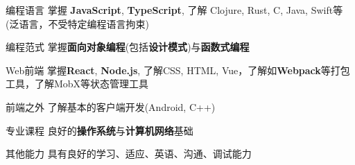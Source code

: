 

\begin{cvskills}

    \cvskill
    {编程语言} %
    {掌握 \textbf{JavaScript}, \textbf{TypeScript}, 了解 Clojure, Rust, C, Java, Swift等(泛语言，不受特定编程语言拘束)} %

    \cvskill
    {编程范式} %
    {掌握\textbf{面向对象编程}(包括\textbf{设计模式})与\textbf{函数式编程}} %

    \cvskill
    {Web前端} %
    {掌握\textbf{React}, \textbf{Node.js}, 了解CSS, HTML, Vue，了解如\textbf{Webpack}等打包工具，了解MobX等状态管理工具} %

    \cvskill
    {前端之外} %
    {了解基本的客户端开发(Android, C++)} %

    \cvskill
    {专业课程} %
    {良好的\textbf{操作系统}与\textbf{计算机网络}基础} %

    \cvskill
    {其他能力} %
    {具有良好的学习、适应、英语、沟通、调试能力}

\end{cvskills}
